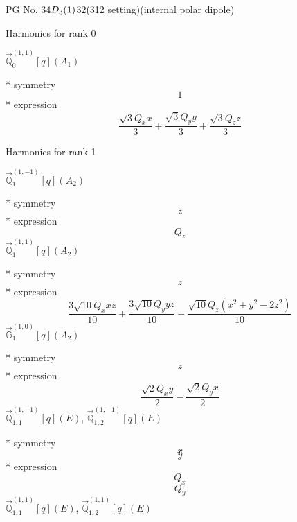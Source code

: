 \documentclass[fleqn,8pt]{jsarticle}
\begin{document}
\setcounter{MaxMatrixCols}{32}

\renewcommand{\tablename}{Table~}
\renewcommand{\figurename}{Figure~}
\begin{center}
\LARGE
PG No. 34\quad$D_{\rm 3}(1)$\quad$32$\quad(312 setting)\quad[ trigonal ] (internal polar dipole)
\end{center}

\noindent * Harmonics for rank 0

\noindent\quad $\vec{\mathbb{Q}}_{0}^{(1,1)}[q](A_{1})$

\noindent\quad ** symmetry
\begin{dmath*}
1
\end{dmath*}
\noindent\quad ** expression
\begin{dmath*}
\frac{\sqrt{3} Q_{x} x}{3} + \frac{\sqrt{3} Q_{y} y}{3} + \frac{\sqrt{3} Q_{z} z}{3}
\end{dmath*}

\noindent * Harmonics for rank 1

\noindent\quad $\vec{\mathbb{Q}}_{1}^{(1,-1)}[q](A_{2})$

\noindent\quad ** symmetry
\begin{dmath*}
z
\end{dmath*}
\noindent\quad ** expression
\begin{dmath*}
Q_{z}
\end{dmath*}
\noindent\quad $\vec{\mathbb{Q}}_{1}^{(1,1)}[q](A_{2})$

\noindent\quad ** symmetry
\begin{dmath*}
z
\end{dmath*}
\noindent\quad ** expression
\begin{dmath*}
\frac{3 \sqrt{10} Q_{x} x z}{10} + \frac{3 \sqrt{10} Q_{y} y z}{10} - \frac{\sqrt{10} Q_{z} \left(x^{2} + y^{2} - 2 z^{2}\right)}{10}
\end{dmath*}
\noindent\quad $\vec{\mathbb{G}}_{1}^{(1,0)}[q](A_{2})$

\noindent\quad ** symmetry
\begin{dmath*}
z
\end{dmath*}
\noindent\quad ** expression
\begin{dmath*}
\frac{\sqrt{2} Q_{x} y}{2} - \frac{\sqrt{2} Q_{y} x}{2}
\end{dmath*}
\noindent\quad $\vec{\mathbb{Q}}_{1,1}^{(1,-1)}[q](E)$, $\vec{\mathbb{Q}}_{1,2}^{(1,-1)}[q](E)$

\noindent\quad ** symmetry
\begin{dmath*}
x
\end{dmath*}
\begin{dmath*}
y
\end{dmath*}
\noindent\quad ** expression
\begin{dmath*}
Q_{x}
\end{dmath*}
\begin{dmath*}
Q_{y}
\end{dmath*}
\noindent\quad $\vec{\mathbb{Q}}_{1,1}^{(1,1)}[q](E)$, $\vec{\mathbb{Q}}_{1,2}^{(1,1)}[q](E)$
\end{document}
